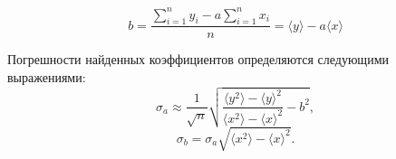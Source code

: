 \begin{equation}
b = \dfrac{\sum\limits_{i=1}^n y_i - a \sum\limits_{i=1}^n x_i}{n} 
= \langle y \rangle - a \langle x \rangle
\end{equation}

Погрешности найденных коэффициентов определяются следующими выражениями:
\begin{equation}
	\sigma_a \approx \frac{1}{\sqrt{n}} \sqrt{\dfrac{\langle y^2 \rangle - \langle y \rangle^2}{\langle x^2 \rangle - \langle x \rangle^2} - b^2},
\end{equation}
\begin{equation}
	\sigma_b = \sigma_a \sqrt{\langle x^2 \rangle - \langle x \rangle^2}.	
\end{equation}
